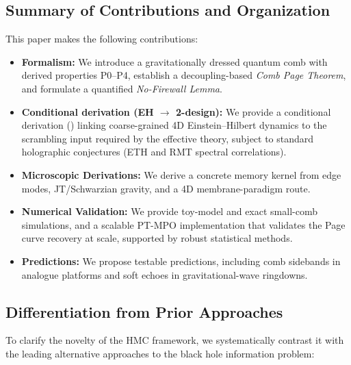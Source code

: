 \documentclass[a4paper,11pt]{article}
\newcommand{\HMC}{\textup{\textsc{HMC}}\xspace}
\theoremstyle{plain}
\theoremstyle{definition}
\theoremstyle{remark}
\begin{document}
\subsection{Summary of Contributions and Organization}
\label{sec:contributions}

This paper makes the following contributions:
\begin{itemize}[leftmargin=*]
    \item \textbf{Formalism:} We introduce a gravitationally dressed quantum comb with derived properties P0--P4, establish a decoupling-based \emph{Comb Page Theorem}, and formulate a quantified \emph{No-Firewall Lemma}.
    \item \textbf{Conditional derivation (EH $\to$ 2-design):} We provide a conditional derivation () linking coarse-grained 4D Einstein--Hilbert dynamics to the scrambling input required by the effective theory, subject to standard holographic conjectures (ETH and RMT spectral correlations).
    \item \textbf{Microscopic Derivations:} We derive a concrete memory kernel from edge modes, JT/Schwarzian gravity, and a 4D membrane-paradigm route.
    \item \textbf{Numerical Validation:} We provide toy-model and exact small-comb simulations, and a scalable PT-MPO implementation that validates the Page curve recovery at scale, supported by robust statistical methods.
    \item \textbf{Predictions:} We propose testable predictions, including comb sidebands in analogue platforms and soft echoes in gravitational-wave ringdowns.
\end{itemize}

\subsection{Differentiation from Prior Approaches}
\label{sec:prior_art_differentiation}

To clarify the novelty of the \HMC{} framework, we systematically contrast it with the leading alternative approaches to the black hole information problem:
\end{document}
